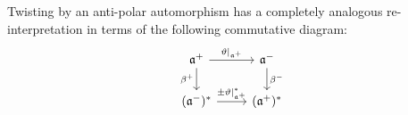 \begin{remark}
            Twisting by an anti-polar automorphism has a completely analogous re-interpretation in terms of the following commutative diagram:
                \begin{equation} \label{diagram: manin_triple_anti_polar_twist_currying}
                    \begin{tikzcd}
                    	{\a^+} & {\a^-} \\
                    	{(\a^-)^*} & {(\a^+)^*}
                    	\arrow["\vartheta|_{\a^+}", from=1-1, to=1-2]
                    	\arrow["{\beta^+}"', from=1-1, to=2-1]
                    	\arrow["{\beta^-}", from=1-2, to=2-2]
                    	\arrow["{\pm \vartheta|_{\a^+}^*}", from=2-1, to=2-2]
                    \end{tikzcd}
                \end{equation}
        \end{remark}
        
